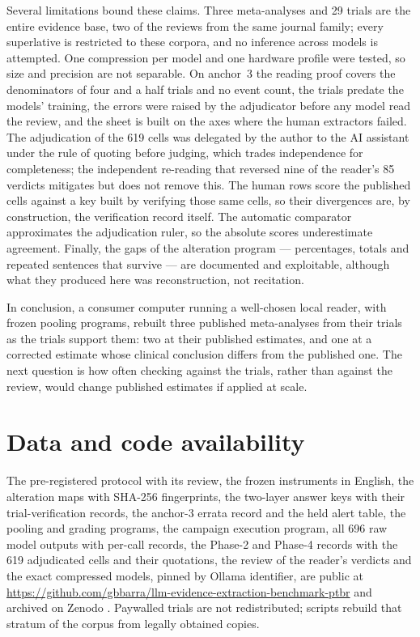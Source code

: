 \documentclass[11pt]{article}
\begin{document}
Several limitations bound these claims. Three meta-analyses and 29 trials are the entire evidence base, two of the reviews from the same journal family; every superlative is restricted to these corpora, and no inference across models is attempted. One compression per model and one hardware profile were tested, so size and precision are not separable. On anchor~3 the reading proof covers the denominators of four and a half trials and no event count, the trials predate the models' training, the errors were raised by the adjudicator before any model read the review, and the sheet is built on the axes where the human extractors failed. The adjudication of the 619 cells was delegated by the author to the AI assistant under the rule of quoting before judging, which trades independence for completeness; the independent re-reading that reversed nine of the reader's 85 verdicts mitigates but does not remove this. The human rows score the published cells against a key built by verifying those same cells, so their divergences are, by construction, the verification record itself. The automatic comparator approximates the adjudication ruler, so the absolute scores underestimate agreement. Finally, the gaps of the alteration program --- percentages, totals and repeated sentences that survive --- are documented and exploitable, although what they produced here was reconstruction, not recitation.

In conclusion, a consumer computer running a well-chosen local reader, with frozen pooling programs, rebuilt three published meta-analyses from their trials as the trials support them: two at their published estimates, and one at a corrected estimate whose clinical conclusion differs from the published one. The next question is how often checking against the trials, rather than against the review, would change published estimates if applied at scale.

\section*{Data and code availability}
The pre-registered protocol with its review, the frozen instruments in English, the alteration maps with SHA-256 fingerprints, the two-layer answer keys with their trial-verification records, the anchor-3 errata record and the held alert table, the pooling and grading programs, the campaign execution program, all 696 raw model outputs with per-call records, the Phase-2 and Phase-4 records with the 619 adjudicated cells and their quotations, the review of the reader's verdicts and the exact compressed models, pinned by Ollama identifier, are public at \url{https://github.com/gbbarra/llm-evidence-extraction-benchmark-ptbr} and archived on Zenodo \citep{barra2026extrai}. Paywalled trials are not redistributed; scripts rebuild that stratum of the corpus from legally obtained copies.
\end{document}

